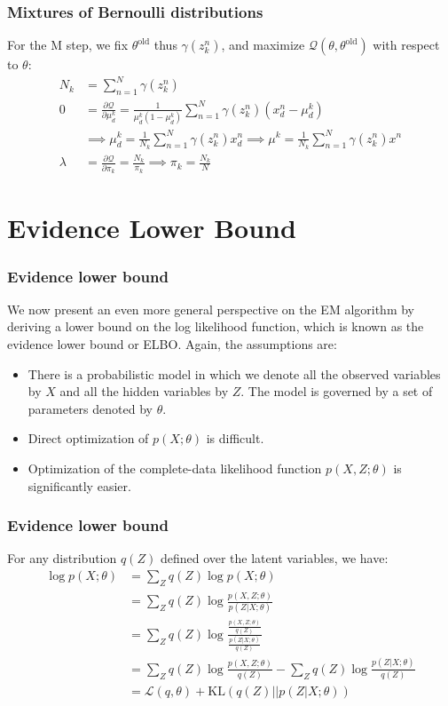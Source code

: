 \documentclass{beamer}
\begin{document}
\begin{frame}
    \frametitle{Mixtures of Bernoulli distributions}
    For the M step, we fix $\theta^{\textrm{old}}$ thus $\gamma(z^{n}_{k})$, and maximize $\mathcal{Q}(\theta,\theta^{\textrm{old}})$ with respect to $\theta$:
    \begin{align*}
        N_{k}&=\sum_{n=1}^{N}\gamma(z^{n}_{k}) \\
        0&=\frac{\partial\mathcal{Q}}{\partial\mu^{k}_{d}}=\frac{1}{\mu^{k}_{d}(1-\mu^{k}_{d})}\sum_{n=1}^{N}\gamma(z^{n}_{k})(x^{n}_{d}-\mu^{k}_{d}) \\
        &\implies\mu^{k}_{d}=\frac{1}{N_{k}}\sum_{n=1}^{N}\gamma(z^{n}_{k})x^{n}_{d}\implies\mu^{k}=\frac{1}{N_{k}}\sum_{n=1}^{N}\gamma(z^{n}_{k})x^{n} \\
        \lambda&=\frac{\partial\mathcal{Q}}{\partial\pi_{k}}=\frac{N_{k}}{\pi_{k}}\implies\pi_{k}=\frac{N_{k}}{N}
    \end{align*}
\end{frame}

\section{Evidence Lower Bound}

\begin{frame}
    \frametitle{Evidence lower bound}
    We now present an even more general perspective on the EM algorithm by deriving a lower bound on the log likelihood function, which is known as the evidence lower bound or ELBO. Again, the assumptions are:
    \begin{itemize}
        \item There is a probabilistic model in which we denote all the observed variables by $X$ and all the hidden variables by $Z$.  The model is governed by a set of parameters denoted by $\theta$.
        \item Direct optimization of $p(X;\theta)$ is difficult.
        \item Optimization of the complete-data likelihood function $p(X,Z;\theta)$ is significantly easier.
    \end{itemize}
\end{frame}

\begin{frame}
    \frametitle{Evidence lower bound}
    For any distribution $q(Z)$ defined over the latent variables, we have:
    \begin{align*}
        \log{}p(X;\theta)&=\sum_{Z}q(Z)\log{}p(X;\theta) \\
        &=\sum_{Z}q(Z)\log\frac{p(X,Z;\theta)}{p(Z|X;\theta)} \\
        &=\sum_{Z}q(Z)\log\frac{\frac{p(X,Z;\theta)}{q(Z)}}{\frac{p(Z|X;\theta)}{q(Z)}} \\
        &=\sum_{Z}q(Z)\log\frac{p(X,Z;\theta)}{q(Z)}-\sum_{Z}q(Z)\log\frac{p(Z|X;\theta)}{q(Z)} \\
        &=\mathcal{L}(q,\theta)+\mathrm{KL}(q(Z)||p(Z|X;\theta))
    \end{align*}
\end{frame}
\end{document}

